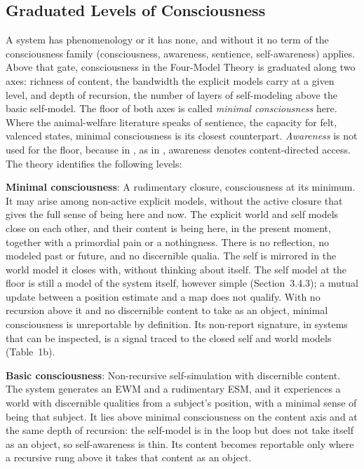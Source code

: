 \documentclass[12pt]{article}
\begin{document}
\subsection{Graduated Levels of Consciousness}


A system has phenomenology or it has none, and without it no term of the consciousness family (consciousness, awareness, sentience, self-awareness) applies. Above that gate, consciousness in the Four-Model Theory is graduated along two axes: richness of content, the bandwidth the explicit models carry at a given level, and depth of recursion, the number of layers of self-modeling above the basic self-model. The floor of both axes is called \emph{minimal consciousness} here. Where the animal-welfare literature speaks of sentience, the capacity for felt, valenced states, minimal consciousness is its closest counterpart. \emph{Awareness} is not used for the floor, because in \citet{Gruber2015}, as in \citet{Chalmers1996}, awareness denotes content-directed access. The theory identifies the following levels:

\textbf{Minimal consciousness}: A rudimentary closure, consciousness at its minimum. It may arise among non-active explicit models, without the active closure that gives the full sense of being here and now. The explicit world and self models close on each other, and their content is being here, in the present moment, together with a primordial pain or a nothingness. There is no reflection, no modeled past or future, and no discernible qualia. The self is mirrored in the world model it closes with, without thinking about itself. The self model at the floor is still a model of the system itself, however simple (Section~3.4.3); a mutual update between a position estimate and a map does not qualify. With no recursion above it and no discernible content to take as an object, minimal consciousness is unreportable by definition. Its non-report signature, in systems that can be inspected, is a signal traced to the closed self and world models (Table~1b).

\textbf{Basic consciousness}: Non-recursive self-simulation with discernible content. The system generates an EWM and a rudimentary ESM, and it experiences a world with discernible qualities from a subject's position, with a minimal sense of being that subject. It lies above minimal consciousness on the content axis and at the same depth of recursion: the self-model is in the loop but does not take itself as an object, so self-awareness is thin. Its content becomes reportable only where a recursive rung above it takes that content as an object.
\end{document}
